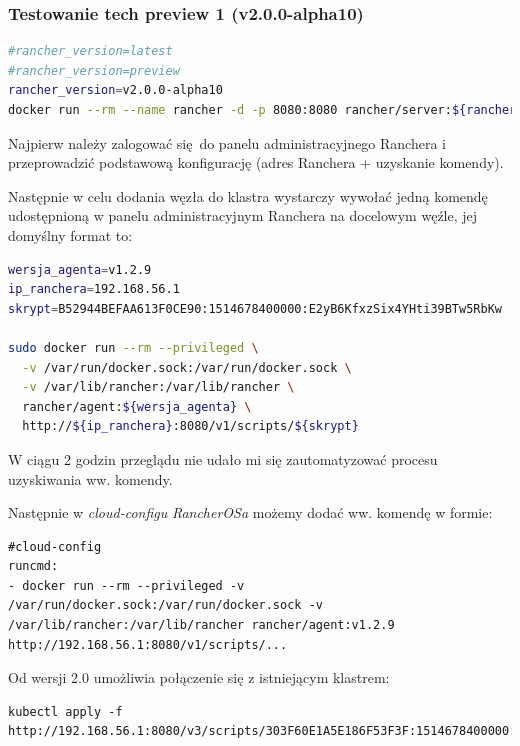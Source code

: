 \documentclass[a4paper,12pt,twoside,openany]{report}
\begin{document}
\hypertarget{testowanie-tech-preview-1-v2.0.0-alpha10}{%
\subsubsection{Testowanie tech preview 1
(v2.0.0-alpha10)}\label{testowanie-tech-preview-1-v2.0.0-alpha10}}

\begin{lstlisting}[language=bash]
#rancher_version=latest
#rancher_version=preview
rancher_version=v2.0.0-alpha10
docker run --rm --name rancher -d -p 8080:8080 rancher/server:${rancher_version}
\end{lstlisting}

Najpierw należy zalogować się~do panelu administracyjnego Ranchera i
przeprowadzić podstawową konfigurację (adres Ranchera + uzyskanie
komendy).

Następnie w celu dodania węzła do klastra wystarczy wywołać jedną
komendę~ udostępnioną w panelu administracyjnym Ranchera na docelowym
węźle, jej domyślny format to:

\begin{lstlisting}[language=bash]
wersja_agenta=v1.2.9
ip_ranchera=192.168.56.1
skrypt=B52944BEFAA613F0CE90:1514678400000:E2yB6KfxzSix4YHti39BTw5RbKw

sudo docker run --rm --privileged \
  -v /var/run/docker.sock:/var/run/docker.sock \
  -v /var/lib/rancher:/var/lib/rancher \
  rancher/agent:${wersja_agenta} \
  http://${ip_ranchera}:8080/v1/scripts/${skrypt}
\end{lstlisting}

W ciągu 2 godzin przeglądu nie udało mi się zautomatyzować procesu
uzyskiwania ww. komendy.

Następnie w \emph{cloud-configu} \emph{RancherOSa} możemy dodać ww.
komendę w formie:

\begin{lstlisting}
#cloud-config
runcmd:
- docker run --rm --privileged -v /var/run/docker.sock:/var/run/docker.sock -v /var/lib/rancher:/var/lib/rancher rancher/agent:v1.2.9 http://192.168.56.1:8080/v1/scripts/...
\end{lstlisting}

Od wersji 2.0 umożliwia połączenie się z istniejącym klastrem:

\begin{lstlisting}
kubectl apply -f http://192.168.56.1:8080/v3/scripts/303F60E1A5E186F53F3F:1514678400000:wstQFdHpOgHqKahoYdmsCXEWMW4.yaml
\end{lstlisting}
\end{document}
